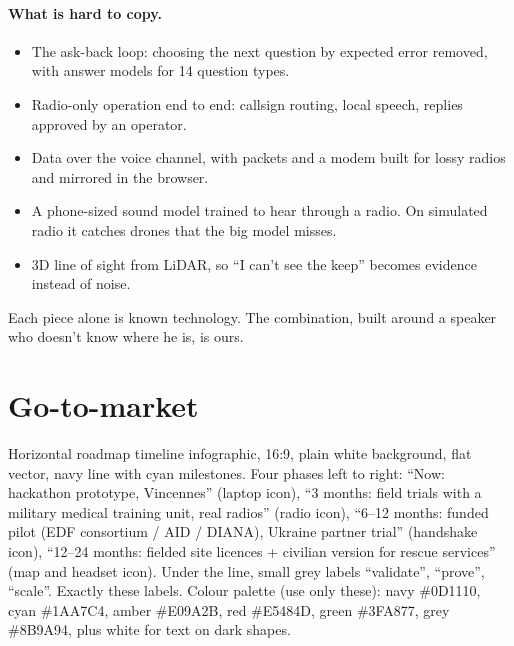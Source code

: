 \paragraph{What is hard to copy.}
\begin{itemize}
  \item The ask-back loop: choosing the next question by expected error removed, with answer models for 14 question types.
  \item Radio-only operation end to end: callsign routing, local speech, replies approved by an operator.
  \item Data over the voice channel, with packets and a modem built for lossy radios and mirrored in the browser.
  \item A phone-sized sound model trained to hear through a radio. On simulated radio it catches drones that the big model misses.
  \item 3D line of sight from LiDAR, so ``I can't see the keep'' becomes evidence instead of noise.
\end{itemize}
Each piece alone is known technology. The combination, built around a speaker who doesn't know where he is, is ours.

\section{Go-to-market}

{Horizontal roadmap timeline infographic, 16:9, plain white background, flat vector, navy line with cyan milestones. Four phases
left to right: ``Now: hackathon prototype, Vincennes'' (laptop icon), ``3 months: field trials with a military medical
training unit, real radios'' (radio icon), ``6–12 months: funded pilot (EDF consortium / AID / DIANA), Ukraine partner
trial'' (handshake icon), ``12–24 months: fielded site licences + civilian version for rescue services'' (map and headset
icon). Under the line, small grey labels ``validate'', ``prove'', ``scale''. Exactly these labels. Colour palette (use only these): navy \#0D1110, cyan \#1AA7C4, amber \#E09A2B, red \#E5484D, green \#3FA877, grey \#8B9A94, plus white for text on dark shapes.}

